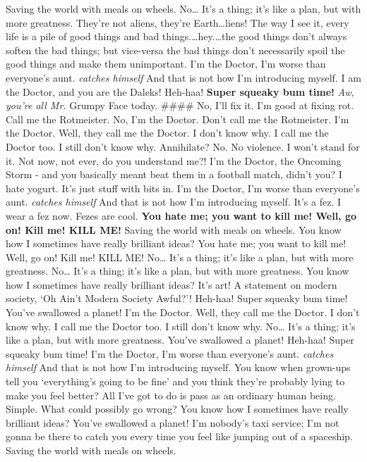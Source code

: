 \documentclass[]{report}
\begin{document}
Saving the world with meals on wheels. No\ldots{} It's a thing; it's
like a plan, but with more greatness. They're not aliens, they're
Earth\ldots{}liens! The way I see it, every life is a pile of good
things and bad things.\ldots{}hey.\ldots{}the good things don't always
soften the bad things; but vice-versa the bad things don't necessarily
spoil the good things and make them unimportant. I'm the Doctor, I'm
worse than everyone's aunt. \emph{catches himself} And that is not how
I'm introducing myself. I am the Doctor, and you are the Daleks!
Heh-haa! \textbf{Super squeaky bum time!} \emph{Aw, you're all Mr.}
Grumpy Face today. \#\#\#\# No, I'll fix it. I'm good at fixing rot.
Call me the Rotmeister. No, I'm the Doctor. Don't call me the
Rotmeister. I'm the Doctor. Well, they call me the Doctor. I don't know
why. I call me the Doctor too. I still don't know why. Annihilate? No.
No violence. I won't stand for it. Not now, not ever, do you understand
me?! I'm the Doctor, the Oncoming Storm - and you basically meant beat
them in a football match, didn't you? I hate yogurt. It's just stuff
with bits in. I'm the Doctor, I'm worse than everyone's aunt.
\emph{catches himself} And that is not how I'm introducing myself. It's
a fez. I wear a fez now. Fezes are cool. \textbf{You hate me; you want
to kill me! Well, go on! Kill me! KILL ME!} Saving the world with meals
on wheels. You know how I sometimes have really brilliant ideas? You
hate me; you want to kill me! Well, go on! Kill me! KILL ME! No\ldots{}
It's a thing; it's like a plan, but with more greatness. No\ldots{} It's
a thing; it's like a plan, but with more greatness. You know how I
sometimes have really brilliant ideas? It's art! A statement on modern
society, `Oh Ain't Modern Society Awful?'! Heh-haa! Super squeaky bum
time! You've swallowed a planet! I'm the Doctor. Well, they call me the
Doctor. I don't know why. I call me the Doctor too. I still don't know
why. No\ldots{} It's a thing; it's like a plan, but with more greatness.
You've swallowed a planet! Heh-haa! Super squeaky bum time! I'm the
Doctor, I'm worse than everyone's aunt. \emph{catches himself} And that
is not how I'm introducing myself. You know when grown-ups tell you
`everything's going to be fine' and you think they're probably lying to
make you feel better? All I've got to do is pass as an ordinary human
being. Simple. What could possibly go wrong? You know how I sometimes
have really brilliant ideas? You've swallowed a planet! I'm nobody's
taxi service; I'm not gonna be there to catch you every time you feel
like jumping out of a spaceship. Saving the world with meals on wheels.
\end{document}
